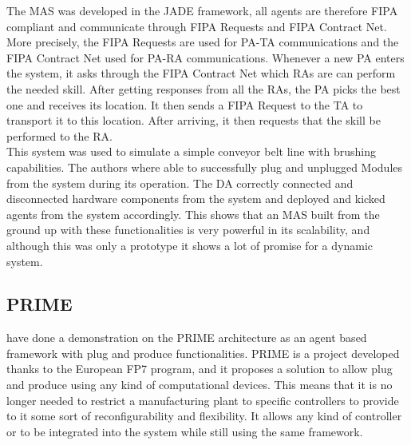 The MAS was developed in the JADE framework, all agents are therefore FIPA compliant and communicate through FIPA Requests and FIPA Contract Net. More precisely, the FIPA Requests are used for PA-TA communications and the FIPA Contract Net used for PA-RA communications. Whenever a new PA enters the system, it asks through the FIPA Contract Net which RAs are can perform the needed skill. After getting responses from all the RAs, the PA picks the best one and receives its location. It then sends a FIPA Request to the TA to transport it to this location. After arriving, it then requests that the skill be performed to the RA.\\

This system was used to simulate a simple conveyor belt line with brushing capabilities. The authors where able to successfully plug and unplugged Modules from the system during its operation. The DA correctly connected and disconnected hardware components from the system and deployed and kicked agents from the system accordingly. This shows that an MAS built from the ground up with these functionalities is very powerful in its scalability, and although this was only a prototype it shows a lot of promise for a dynamic system.

\subsection{PRIME}

\citeauthor{PRIME_plug_and_produce} \cite{PRIME_plug_and_produce} have done a demonstration on the PRIME architecture as an agent based framework with plug and produce functionalities. PRIME is a project developed thanks to the European FP7 program, and it proposes a solution to allow plug and produce using any kind of computational devices. This means that it is no longer needed to restrict a manufacturing plant to specific controllers to provide to it some sort of reconfigurability and flexibility. It allows any kind of controller or to be integrated into the system while still using the same framework.\\

